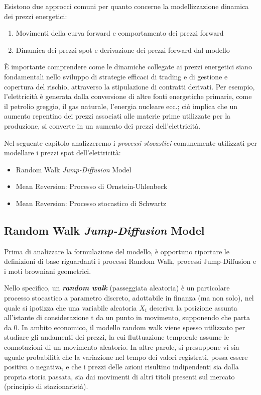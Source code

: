 \documentclass[12pt,a4paper]{report}
\begin{document}
Esistono due approcci comuni per quanto concerne la modellizzazione dinamica dei prezzi energetici:

\begin{enumerate}
    \item Movimenti della curva forward e comportamento dei prezzi forward
    \item Dinamica dei prezzi spot e derivazione dei prezzi forward dal modello
\end{enumerate}

È importante comprendere come le dinamiche collegate ai prezzi energetici siano fondamentali nello sviluppo di strategie efficaci di trading e di gestione e copertura del rischio, attraverso la stipulazione di contratti derivati. Per esempio, l'elettricità è generata dalla conversione di altre fonti energetiche primarie, come il petrolio greggio, il gas naturale, l'energia nucleare ecc.; ciò implica che un aumento repentino dei prezzi associati alle materie prime utilizzate per la produzione, si converte in un aumento dei prezzi dell'elettricità.

Nel seguente capitolo analizzeremo i \textit{processi stocastici} comunemente utilizzati per modellare i prezzi spot dell'elettricità:

\begin{itemize}
    \item Random Walk \textit{Jump-Diffusion} Model
    \item Mean Reversion: Processo di Ornstein-Uhlenbeck
    \item Mean Reversion: Processo stocastico di Schwartz
\end{itemize}


\subsection{Random Walk \textit{Jump-Diffusion} Model}


Prima di analizzare la formulazione del modello, è opportuno riportare le definizioni di base riguardanti i processi Random Walk, processi Jump-Diffusion e i moti browniani geometrici.

Nello specifico, un \textbf{\textit{random walk}} (passeggiata aleatoria) è un particolare processo stocastico a parametro discreto, adottabile in finanza (ma non solo), nel quale si ipotizza che una variabile aleatoria $X_t$ descriva la posizione assunta all'istante di considerazione t da un punto in movimento, supponendo che parta da 0. In ambito economico, il modello random walk viene spesso utilizzato per studiare gli andamenti dei prezzi, la cui fluttuazione temporale assume le connotazioni di un movimento aleatorio. In altre parole, si presuppone vi sia uguale probabilità che la variazione nel tempo dei valori registrati, possa essere positiva o negativa, e che i prezzi delle azioni risultino indipendenti sia dalla propria storia passata, sia dai movimenti di altri titoli presenti sul mercato (principio di stazionarietà).
\end{document}
